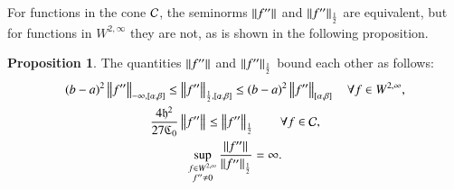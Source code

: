 \documentclass[review]{elsarticle}
\theoremstyle{definition}
\renewcommand{\cw}{W}
\newtheorem{prop}[theorem]{Proposition}
\begin{document}
For functions in the cone $\cc$, the seminorms $\norm{f''}$ and $\norm[\frac
12]{f''}$ are equivalent, but  for functions in $ \cw^{2,\infty}$ they are not, as is shown in the following proposition.

\begin{prop} \label{equivnormprop} The quantities $\norm{f''}$ and $\norm[\frac 12]{f''}$ bound each other as follows:
	\begin{subequations}
		\begin{gather}
		\label{halflessinf}
		(b-a)^2\norm[-\infty,{[\alpha,\beta]}]{f''}  \le \norm[\frac 12,{[\alpha,\beta]}]{f''}  \le (b-a)^2 \norm[{[\alpha,\beta]}]{f''} \quad \forall f \in \cw^{2,\infty}, \\
		\label{inflesshalf}
		\frac{4\fh^2}{27\fC_0} \norm{f''} \le \norm[\frac 12]{f''} \qquad \forall f \in \cc, \\
		\label{infhalfnoteq}
		\sup_{\substack{f \in \cw^{2,\infty}\\ f'' \ne 0}}  \frac{\norm{f''}}{\norm[\frac 12]{f''}} = \infty.
		\end{gather}
	\end{subequations}
\end{prop}
\end{document}
